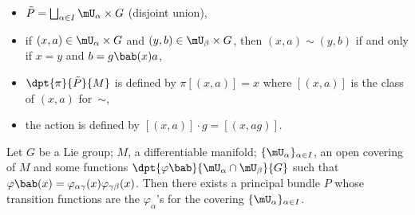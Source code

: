 				\begin{itemize}
				\item $\tilde{P}=\bigsqcup_{\alpha\in I}\mU_{\alpha}\times G$  (disjoint union),
				\item if $(x,a)\in\mU_{\alpha}\times G$ and $(y,b)\in\mU_{\beta}\times G$, then $(x,a)\sim(y,b)$ if and only if $x=y$ and $b=g\bab(x)a$,
				\item $\dpt{\pi}{\tilde{P}}{M}$ is defined by $\pi[(x,a)]=x$ where $[(x,a)]$ is the class of $(x,a)$ for~$\sim$,
				\item the action is defined by $[(x,a)]\cdot g=[(x,ag)]$.
				\end{itemize}

				\begin{theorem}
				Let $G$ be a Lie group; $M$, a differentiable manifold; $\{\mU_{\alpha}\}_{\alpha\in I}$, an open covering of $M$ and some functions $\dpt{\varphi\bab}{\mU_{\alpha}\cap\mU_{\beta}}{G}$ such that $\varphi\bab(x)=\varphi_{\alpha\gamma}(x)\varphi_{\gamma\beta}(x)$. Then there exists a principal bundle $P$ whose transition functions are the $\varphi_{\alpha}$'s for the covering $\{\mU_{\alpha}\}_{\alpha\in I}$.
				\end{theorem}


